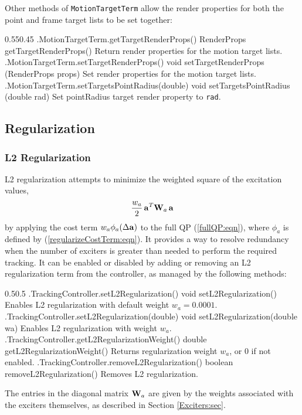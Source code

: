 Other methods of {\tt MotionTargetTerm} allow the render properties for both
the point and frame target lists to be set together:
%
\begin{methodtable}{0.55}{0.45}
\midline
%
\methodentry
{\inverse.MotionTargetTerm.getTargetRenderProps()}%
{RenderProps getTargetRenderProps()}%
{Return render properties for the motion target lists.}%
%
\methodentry
{\inverse.MotionTargetTerm.setTargetRenderProps()}%
{void setTargetRenderProps (RenderProps props)}%
{Set render properties for the motion target lists.}%
%
\methodentry
{\inverse.MotionTargetTerm.setTargetsPointRadius(double)}%
{void setTargetsPointRadius (double rad)}%
{Set {\sf pointRadius} target render property to {\tt rad}.}%
%
\midline
\end{methodtable}
%

\subsection{Regularization}
\label{Regularization:sec}

\subsubsection{L2 Regularization}
\label{L2Regularization:sec}

L2 regularization attempts to minimize the weighted square of the
excitation values, 
%
\begin{equation}
\frac{w_a}{2} \, {\bf a}^T {\bf W}_a \, {\bf a}
\label{L2regularization:eqn}
\end{equation}
%
by applying the cost term $w_a \phi_a (\Delta{\bf a})$ to the full QP
(\ref{fullQP:eqn}), where $\phi_a$ is defined by
(\ref{regularizeCostTerm:eqn}). It provides a way to resolve
redundancy when the number of exciters is greater than needed to
perform the required tracking. It can be enabled or disabled by adding
or removing an L2 regularization term from the controller, as managed
by the following methods:
%
\begin{methodtable}{0.5}{0.5}
\midline
%
\methodentry
{\inverse.TrackingController.setL2Regularization()}%
{void setL2Regularization()}%
{Enables L2 regularization with default weight $w_a = 0.0001$.}%
%
\methodentry
{\inverse.TrackingController.setL2Regularization(double)}%
{void setL2Regularization(double wa)}%
{Enables L2 regularization with weight $w_a$.}%
%
\methodentry
{\inverse.TrackingController.getL2RegularizationWeight()}%
{double getL2RegularizationWeight()}%
{Returns regularization weight $w_a$, or 0 if not enabled.}%
%
\methodentry
{\inverse.TrackingController.removeL2Regularization()}%
{boolean removeL2Regularization()}%
{Removes L2 regularization.}%
%
\midline
\end{methodtable}
%
The entries in the
diagonal matrix ${\bf W}_a$ are given by the weights associated with the exciters
themselves, as described in Section \ref{Exciters:sec}.

